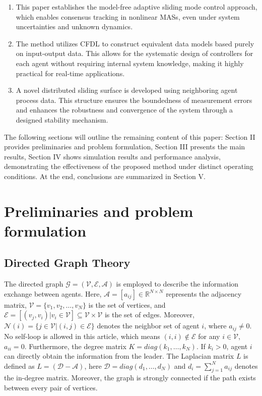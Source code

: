 \documentclass[journal,onecolumn]{IEEEtran}
\begin{document}
\begin{enumerate}

    \item This paper establishes the model-free adaptive sliding mode control approach, which enables consensus tracking in nonlinear MASs, even under system uncertainties and unknown dynamics.
    
    \item The method utilizes CFDL to construct equivalent data models based purely on input-output data. This allows for the systematic design of controllers for each agent without requiring internal system knowledge, making it highly practical for real-time applications.
    
    \item A novel distributed sliding surface is developed using neighboring agent process data. This structure ensures the boundedness of measurement errors and enhances the robustness and convergence of the system through a designed stability mechanism.

\end{enumerate}


    The following sections will outline the remaining content of this paper:
    Section II provides preliminaries and problem formulation, Section III presents the main results, Section IV shows simulation results and performance analysis, demonstrating the effectiveness of the proposed method under distinct operating conditions. At the end, conclusions are summarized in Section V.


\section{Preliminaries and problem formulation}\label{section:2}
\subsection{Directed Graph Theory}

\indent The directed graph $ \mathcal{G} = (\mathcal{V}, \mathcal{E}, \mathcal{A}) $ is employed to describe the information exchange between agents. Here, $ \mathcal{A} = [a_{ij}] \in \mathbb{R}^{N \times N} $ represents the adjacency matrix, $ \mathcal{V}=\{v_1, v_2,\dots,v_N\} $ is the set of vertices, and $ \mathcal{E} = [(v_j,v_i)|v_i \in \mathcal{V} ] \subseteq \mathcal{V} \times \mathcal{V}$ is the set of edges. Moreover, $ \mathcal{N}(i) = \{j \in \mathcal{V} |(i,j) \in \mathcal{E}\} $ denotes the neighbor set of agent $ i $, where $ a_{i j} \neq 0$. No self-loop is allowed in this article, which means $(i, i) \notin \mathcal{E}$ for any $ i \in \mathcal{V} $, $ a_{ii}=0$. Furthermore, the degree matrix $ K = diag(k_1,\dots,k_N)$. If $ k_i > 0$, agent $ i $ can directly obtain the information from the leader. The Laplacian matrix $ L $ is defined as $ L = (\mathcal{D}-\mathcal{A})$, here $\mathcal{D} = diag({d_1,\dots,d_N})$ and $d_i=\sum_{j=1}^{N} a_{i j}$ denotes the in-degree matrix. Moreover, the graph is strongly connected if the path exists between every pair of vertices.
\end{document}
